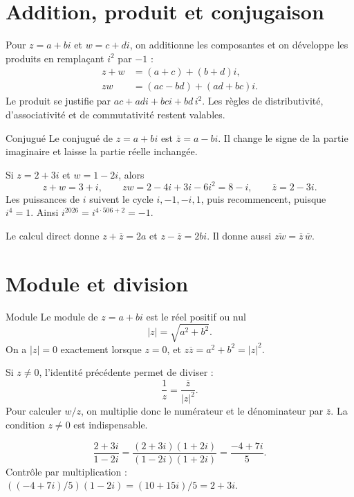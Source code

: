 \section{Addition, produit et conjugaison}
\label{manual:section:complexes.02}

Pour $z=a+bi$ et $w=c+di$, on additionne les composantes et on développe les produits en remplaçant $i^2$ par $-1$ :
\begin{align*}
z+w&=(a+c)+(b+d)i,\\
zw&=(ac-bd)+(ad+bc)i.
\end{align*}
Le produit se justifie par $ac+adi+bci+bd\,i^2$. Les règles de distributivité, d'associativité et de commutativité restent valables.

\begin{definition}{Conjugué}{}
Le conjugué de $z=a+bi$ est $\overline z=a-bi$. Il change le signe de la partie imaginaire et laisse la partie réelle inchangée.
\end{definition}

\begin{examplebox}
Si $z=2+3i$ et $w=1-2i$, alors
\[
z+w=3+i,\qquad zw=2-4i+3i-6i^2=8-i,
\qquad\overline z=2-3i.
\]
Les puissances de $i$ suivent le cycle $i,-1,-i,1$, puis recommencent, puisque $i^4=1$. Ainsi $i^{2026}=i^{4\cdot506+2}=-1$.
\end{examplebox}

Le calcul direct donne $z+\overline z=2a$ et $z-\overline z=2bi$. Il donne aussi $\overline{zw}=\overline z\,\overline w$.

\section{Module et division}
\label{manual:section:complexes.03}

\begin{definition}{Module}{}
Le module de $z=a+bi$ est le réel positif ou nul
\[
|z|=\sqrt{a^2+b^2}.
\]
On a $|z|=0$ exactement lorsque $z=0$, et $z\overline z=a^2+b^2=|z|^2$.
\end{definition}

Si $z\ne0$, l'identité précédente permet de diviser :
\[
\frac1z=\frac{\overline z}{|z|^2}.
\]
Pour calculer $w/z$, on multiplie donc le numérateur et le dénominateur par $\overline z$. La condition $z\ne0$ est indispensable.

\begin{examplebox}
\[
\frac{2+3i}{1-2i}
=\frac{(2+3i)(1+2i)}{(1-2i)(1+2i)}
=\frac{-4+7i}{5}.
\]
Contrôle par multiplication : $((-4+7i)/5)(1-2i)=(10+15i)/5=2+3i$.
\end{examplebox}

